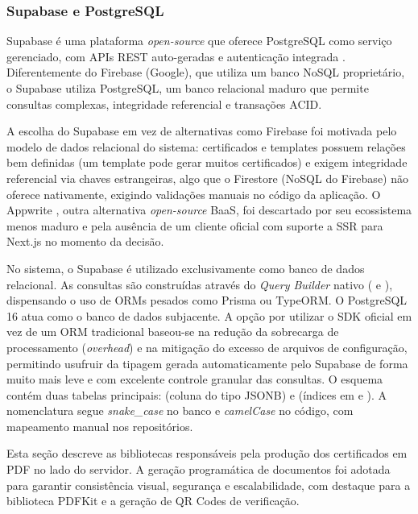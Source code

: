 \subsubsection{Supabase e PostgreSQL}
Supabase é uma plataforma \textit{open-source} que oferece PostgreSQL como serviço gerenciado, com APIs REST auto-geradas e autenticação integrada \cite{supabase2025}. Diferentemente do Firebase (Google), que utiliza um banco NoSQL proprietário, o Supabase utiliza PostgreSQL, um banco relacional maduro que permite consultas complexas, integridade referencial e transações ACID.

A escolha do Supabase em vez de alternativas como Firebase foi motivada pelo modelo de dados relacional do sistema: certificados e templates possuem relações bem definidas (um template pode gerar muitos certificados) e exigem integridade referencial via chaves estrangeiras, algo que o Firestore (NoSQL do Firebase) não oferece nativamente, exigindo validações manuais no código da aplicação. O Appwrite \cite{appwrite2025}, outra alternativa \textit{open-source} BaaS, foi descartado por seu ecossistema menos maduro e pela ausência de um cliente oficial com suporte a SSR para Next.js no momento da decisão.

No sistema, o Supabase é utilizado exclusivamente como banco de dados relacional. As consultas são construídas através do \textit{Query Builder} nativo ( e ), dispensando o uso de ORMs pesados como Prisma ou TypeORM. O PostgreSQL 16 \cite{postgresql2025} atua como o banco de dados subjacente. A opção por utilizar o SDK oficial em vez de um ORM tradicional baseou-se na redução da sobrecarga de processamento (\textit{overhead}) e na mitigação do excesso de arquivos de configuração, permitindo usufruir da tipagem gerada automaticamente pelo Supabase de forma muito mais leve e com excelente controle granular das consultas. O esquema contém duas tabelas principais:  (coluna  do tipo JSONB) e  (índices em  e ). A nomenclatura segue \textit{snake\_case} no banco e \textit{camelCase} no código, com mapeamento manual nos repositórios.


Esta seção descreve as bibliotecas responsáveis pela produção dos certificados em PDF no lado do servidor. A geração programática de documentos foi adotada para garantir consistência visual, segurança e escalabilidade, com destaque para a biblioteca PDFKit e a geração de QR Codes de verificação.

